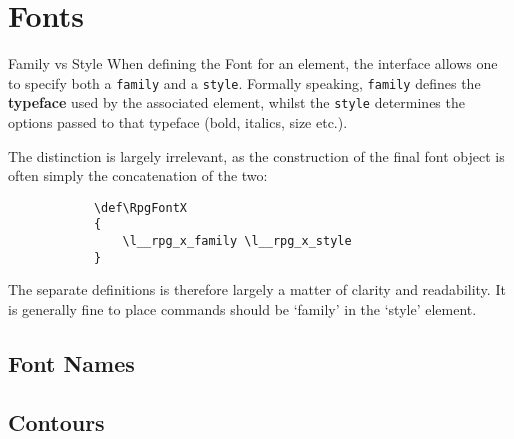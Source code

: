 \chapter{Fonts}
	\begin{RpgSidebar}{Family vs Style}
		When defining the Font for an element, the interface allows one to specify both a \texttt{family} and a \texttt{style}. Formally speaking, \texttt{family} defines the \textbf{typeface} used by the associated element, whilst the \texttt{style} determines the options passed to that typeface (bold, italics, size etc.).

		The distinction is largely irrelevant, as the construction of the final font object is often simply the concatenation of the two:
		\begin{lstlisting}
			\def\RpgFontX
			{
				\l__rpg_x_family \l__rpg_x_style
			}
		\end{lstlisting}
		The separate definitions is therefore largely a matter of clarity and readability. It is generally fine to place commands should be `family' in the `style' element.
	\end{RpgSidebar}
	\section{Font Names}

	\section{Contours}
		
